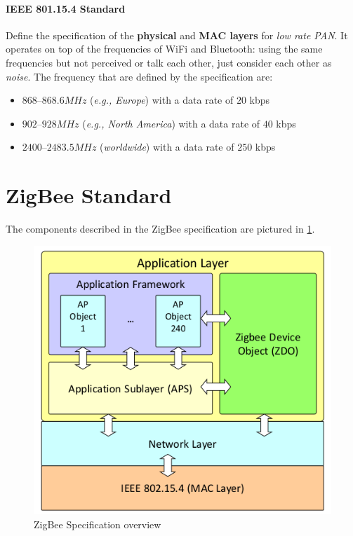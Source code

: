 \documentclass[10pt,a4paper]{report}
\theoremstyle{definition}
\begin{document}
\paragraph{IEEE 801.15.4 Standard}\label{sec:ieee-801154-standard}
Define the specification of the \textbf{physical} and \textbf{MAC layers} for \textit{low rate PAN}. It operates on top of the frequencies of WiFi and Bluetooth: using the same frequencies but not perceived or talk each other, just consider each other as \textit{noise}. The frequency that are defined by the specification are:
\begin{itemize}
	\item 
	$868–868.6 MHz$ (\textit{e.g., Europe}) with a data rate of $20$ kbps
	\item
	$902–928 MHz$ (\textit{e.g., North America}) with a data rate of $40$ kbps
	\item 
	$2400–2483.5 MHz$ (\textit{worldwide}) with a data rate of $250$ kbps
\end{itemize}

\section{ZigBee Standard}\label{sec:zigbee-standard}
The components described in the ZigBee specification are pictured in \ref{zigbee-specification}. 
\begin{figure}[h!]
	\centering\includegraphics[scale=0.40]{images/Pasted image 20230307162949.png}
	\caption{ZigBee Specification overview}
	\label{zigbee-specification}
\end{figure}
\end{document}
